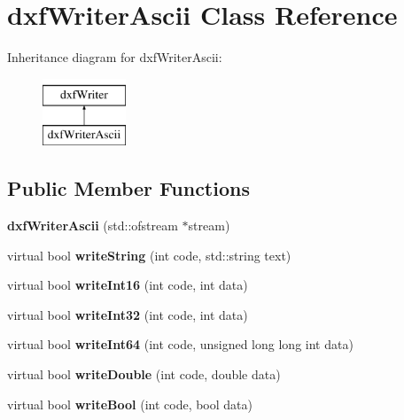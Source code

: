 \hypertarget{classdxfWriterAscii}{\section{dxf\-Writer\-Ascii Class Reference}
\label{classdxfWriterAscii}
}
Inheritance diagram for dxf\-Writer\-Ascii\-:\begin{figure}[H]
\begin{center}
\leavevmode
\includegraphics[height=2.000000cm]{classdxfWriterAscii}
\end{center}
\end{figure}
\subsection*{Public Member Functions}
\begin{DoxyCompactItemize}
\item 
\hypertarget{classdxfWriterAscii_ad6166e48e1cacaa4e091d1495c54e12e}{{\bfseries dxf\-Writer\-Ascii} (std\-::ofstream $\ast$stream)}\label{classdxfWriterAscii_ad6166e48e1cacaa4e091d1495c54e12e}

\item 
\hypertarget{classdxfWriterAscii_a8bf839ed6d11f85e252c03269d2889eb}{virtual bool {\bfseries write\-String} (int code, std\-::string text)}\label{classdxfWriterAscii_a8bf839ed6d11f85e252c03269d2889eb}

\item 
\hypertarget{classdxfWriterAscii_a8cb0cfd66b43b1babdd41fd5271f6c5c}{virtual bool {\bfseries write\-Int16} (int code, int data)}\label{classdxfWriterAscii_a8cb0cfd66b43b1babdd41fd5271f6c5c}

\item 
\hypertarget{classdxfWriterAscii_a7d1153905ad4efa3823ead25b43fa2af}{virtual bool {\bfseries write\-Int32} (int code, int data)}\label{classdxfWriterAscii_a7d1153905ad4efa3823ead25b43fa2af}

\item 
\hypertarget{classdxfWriterAscii_ae0837a11468429fd4aaf8ac859cd4655}{virtual bool {\bfseries write\-Int64} (int code, unsigned long long int data)}\label{classdxfWriterAscii_ae0837a11468429fd4aaf8ac859cd4655}

\item 
\hypertarget{classdxfWriterAscii_af5b1814e3eec935ff9b193e1adf0fde7}{virtual bool {\bfseries write\-Double} (int code, double data)}\label{classdxfWriterAscii_af5b1814e3eec935ff9b193e1adf0fde7}

\item 
\hypertarget{classdxfWriterAscii_ab5b904bd10dcd43c095fa63f9f12b043}{virtual bool {\bfseries write\-Bool} (int code, bool data)}\label{classdxfWriterAscii_ab5b904bd10dcd43c095fa63f9f12b043}

\end{DoxyCompactItemize}
